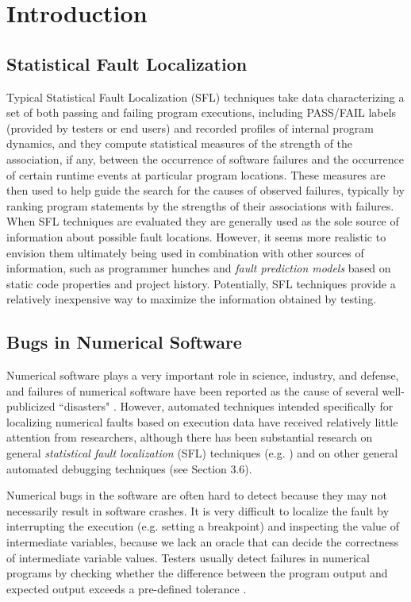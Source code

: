 \chapter{Introduction}\label{chap:introduction}
\section{Statistical Fault Localization}
Typical Statistical Fault Localization (SFL) techniques take data characterizing a set of both passing and failing program executions, including PASS/FAIL labels (provided by testers or end users) and recorded profiles of internal program dynamics, and they compute statistical measures of the strength of the association, if any, between the occurrence of software failures and the occurrence of certain runtime events at particular program locations.  These measures are then used to help guide the search for the causes of observed failures, typically by ranking program statements by the strengths of their associations with failures.  When SFL techniques are evaluated they are generally used as the sole source of information about possible fault locations.  However, it seems more realistic to envision them ultimately being used in combination with other sources of information, such as programmer hunches and {\it fault prediction models} \cite{Fenton1999} based on static code properties and project history.  Potentially, SFL techniques provide a relatively inexpensive way to maximize the information obtained by testing.


\section{Bugs in Numerical Software}
Numerical software plays a very important role in science, industry, and defense, and failures of numerical software have been reported as the cause of several well-publicized ``disasters" \cite{VuikWeb,Kanewala2014}.  However, automated techniques intended specifically for localizing numerical faults based on execution data have received relatively little attention from researchers, although there has been substantial research on general {\it statistical fault localization} (SFL) techniques (e.g. \cite{Jones2002,Liblit2004,Liu2005}) and on other general automated debugging techniques (see Section 3.6).

Numerical bugs in the software are often hard to detect because they may not necessarily result in software crashes. It is very difficult to localize the fault by interrupting the execution (e.g. setting a breakpoint) and inspecting the value of intermediate variables, because we lack an oracle that can decide the correctness of intermediate variable values. Testers usually detect failures in numerical programs by checking whether the difference between the program output and expected output exceeds a pre-defined tolerance \cite{commontest}.

